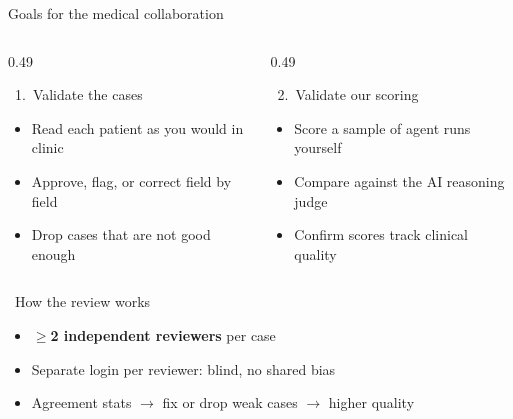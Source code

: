 \documentclass[aspectratio=169,t]{beamer}
\begin{document}
\begin{frame}{Goals for the medical collaboration}
  \centering\footnotesize\color{CERNtextdark}
  \begin{columns}[T,onlytextwidth]
    \begin{column}{0.49\textwidth}
      \begin{block}{\faStethoscope\;\, 1.\ Validate the cases}
        \footnotesize
        \begin{itemize}\setlength\itemsep{0.2em}
          \item Read each patient as you would in clinic
          \item Approve, flag, or correct field by field
          \item Drop cases that are not good enough
        \end{itemize}
      \end{block}
    \end{column}%
    \hfill
    \begin{column}{0.49\textwidth}
      \begin{alertblock}{\faGavel\;\, 2.\ Validate our scoring}
        \footnotesize
        \begin{itemize}\setlength\itemsep{0.2em}
          \item Score a sample of agent runs yourself
          \item Compare against the AI reasoning judge
          \item Confirm scores track clinical quality
        \end{itemize}
      \end{alertblock}
    \end{column}
  \end{columns}

  \vspace{1.5mm}
  \begin{exampleblock}{\faUsers\;\, How the review works}
    \footnotesize
    \begin{itemize}\setlength\itemsep{0.15em}
      \item $\geq$\textbf{2 independent reviewers} per case
      \item Separate login per reviewer: blind, no shared bias
      \item Agreement stats $\rightarrow$ fix or drop weak cases $\rightarrow$ higher quality
    \end{itemize}
  \end{exampleblock}
\end{frame}
\end{document}
